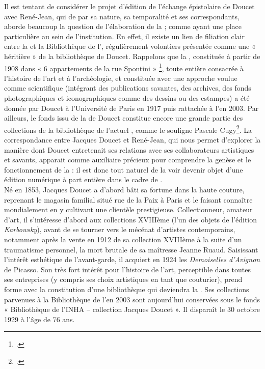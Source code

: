 Il est tentant de considérer le projet d’édition de l’échange épistolaire de Doucet avec René-Jean, qui de par sa nature, sa temporalité et ses correspondants, aborde beaucoup la question de l’élaboration de la \baa ; comme ayant une place particulière au sein de l’institution. En effet, il existe un lien de filiation clair entre la \baa et la Bibliothèque de l’\inha, régulièrement volontiers présentée comme une « héritière » de la bibliothèque de Doucet. Rappelons que la \baa, constituée à partir de 1908 dans « 6 appartements de la rue Spontini » \footcite{flejou_jacques_2015}, toute entière consacrée à l’histoire de l’art et à l’archéologie, et constituée avec une approche voulue comme scientifique (intégrant des publications savantes, des archives, des fonds photographiques et iconographiques comme des dessins ou des estampes) a été donnée par Doucet à l’Université de Paris en 1917 puis rattachée à l’\inha en 2003. Par ailleurs, le fonds issu de la \baa de Doucet constitue encore une grande partie des collections de la bibliothèque de l’actuel \inha, comme le souligne Pascale Cugy\footcite[p.2]{cugy_histoire_2020}. 
La correspondance entre Jacques Doucet et René-Jean, qui nous permet d’explorer la manière dont Doucet entretenait ses relations avec ses collaborateurs artistiques et savants, apparait comme auxiliaire précieux pour comprendre la genèse et le fonctionnement de la \baa : il est donc tout naturel de la voir devenir objet d’une édition numérique à part entière dans le cadre de \pense. 
\newline
{}\\

Né en 1853, Jacques Doucet a d'abord bâti sa fortune dans la haute couture, reprenant le magasin familial situé rue de la Paix à Paris et le faisant connaître mondialement en y cultivant une clientèle prestigieuse. Collectionneur, amateur d’art, il s’intéresse d’abord aux collections XVIIIème (l’un des objets de l’édition \textit{Karbowsky}), avant de se tourner vers le mécénat d’artistes contemporains, notamment après la vente en 1912 de sa collection XVIIIème à la suite d’un traumatisme personnel, la mort brutale de sa maîtresse Jeanne Ruaud. Saisissant l’intérêt esthétique de l’avant-garde, il acquiert en 1924 les \textit{Demoiselles d’Avignon} de Picasso. Son très fort intérêt pour l’histoire de l’art, perceptible dans toutes ses entreprises (y compris ses choix artistiques en tant que couturier), prend forme avec la constitution d’une bibliothèque qui deviendra la \baa. Ses collections parvenues à la Bibliothèque de l’\inha en 2003 sont aujourd’hui conservées sous le fonds « Bibliothèque de l’INHA – collection Jacques Doucet ». Il disparaît le 30 octobre 1929 à l’âge de 76 ans.

